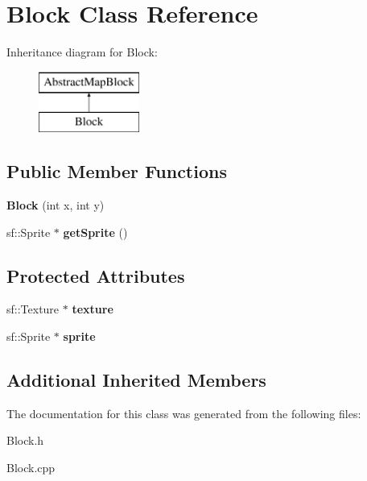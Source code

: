 \hypertarget{class_block}{}\section{Block Class Reference}
\label{class_block}
Inheritance diagram for Block\+:\begin{figure}[H]
\begin{center}
\leavevmode
\includegraphics[height=2.000000cm]{class_block}
\end{center}
\end{figure}
\subsection*{Public Member Functions}
\begin{DoxyCompactItemize}
\item 
\mbox{\label{class_block_a3ff2925a4aa73cb9cabe5097b79f636e}} 
{\bfseries Block} (int x, int y)
\item 
\mbox{\label{class_block_acd9b061af3ad9e79cf49bf9d4dc3d8b9}} 
sf\+::\+Sprite $\ast$ {\bfseries get\+Sprite} ()
\end{DoxyCompactItemize}
\subsection*{Protected Attributes}
\begin{DoxyCompactItemize}
\item 
\mbox{\label{class_block_a61ef2e4fef4ab4a950d3217f88cb8369}} 
sf\+::\+Texture $\ast$ {\bfseries texture}
\item 
\mbox{\label{class_block_a5cf88ebac5cc92a309ec3e0d9c9d5fe8}} 
sf\+::\+Sprite $\ast$ {\bfseries sprite}
\end{DoxyCompactItemize}
\subsection*{Additional Inherited Members}


The documentation for this class was generated from the following files\+:\begin{DoxyCompactItemize}
\item 
Block.\+h\item 
Block.\+cpp\end{DoxyCompactItemize}
